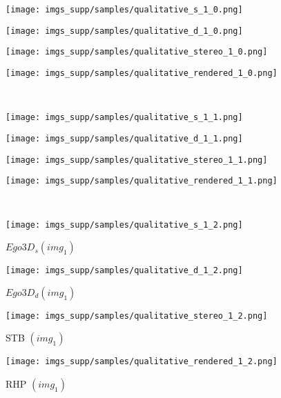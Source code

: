 \documentclass[10pt,twocolumn,letterpaper]{article}
\begin{document}
\begin{figure*}[h]
  \begin{subfigure}[t]{0.29283019\linewidth}
    \texttt{[image: imgs\_supp/samples/qualitative\_s\_1\_0.png]}
  \end{subfigure}
  \begin{subfigure}[t]{0.29283019\linewidth}
    \texttt{[image: imgs\_supp/samples/qualitative\_d\_1\_0.png]}
  \end{subfigure}
  \begin{subfigure}[t]{0.21962264\linewidth}
    \texttt{[image: imgs\_supp/samples/qualitative\_stereo\_1\_0.png]}
  \end{subfigure}
  \begin{subfigure}[t]{0.16471698\linewidth}
    \texttt{[image: imgs\_supp/samples/qualitative\_rendered\_1\_0.png]}
  \end{subfigure}\\
  \begin{subfigure}[t]{0.29283019\linewidth}
    \texttt{[image: imgs\_supp/samples/qualitative\_s\_1\_1.png]}
  \end{subfigure}
  \begin{subfigure}[t]{0.29283019\linewidth}
    \texttt{[image: imgs\_supp/samples/qualitative\_d\_1\_1.png]}
  \end{subfigure}
  \begin{subfigure}[t]{0.21962264\linewidth}
    \texttt{[image: imgs\_supp/samples/qualitative\_stereo\_1\_1.png]}
  \end{subfigure}
  \begin{subfigure}[t]{0.16471698\linewidth}
    \texttt{[image: imgs\_supp/samples/qualitative\_rendered\_1\_1.png]}
  \end{subfigure}\\
  \begin{subfigure}[t]{0.29283019\linewidth}
    \texttt{[image: imgs\_supp/samples/qualitative\_s\_1\_2.png]}
    \caption{$Ego3D_{s} (img_{1})$}\label{fig:qualitative_ego_s}
  \end{subfigure}
  \begin{subfigure}[t]{0.29283019\linewidth}
    \texttt{[image: imgs\_supp/samples/qualitative\_d\_1\_2.png]}
    \caption{$Ego3D_{d} (img_{1})$}\label{fig:qualitative_ego_d}
  \end{subfigure}
  \begin{subfigure}[t]{0.21962264\linewidth}
    \texttt{[image: imgs\_supp/samples/qualitative\_stereo\_1\_2.png]}
    \caption{STB $(img_{1})$}\label{fig:qualitative_stb}
  \end{subfigure}
  \begin{subfigure}[t]{0.16471698\linewidth}
    \texttt{[image: imgs\_supp/samples/qualitative\_rendered\_1\_2.png]}
    \caption{RHP $(img_{1})$}\label{fig:qualitative_rhp}
  \end{subfigure}
  \vspace{0.2cm}
  \vspace{-0.4cm}
\end{figure*}
\end{document}
